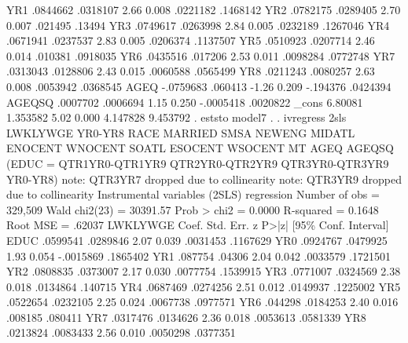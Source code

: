          YR1 {\VBAR}   .0844662   .0318107     2.66   0.008     .0221182    .1468142
         YR2 {\VBAR}   .0782175   .0289405     2.70   0.007      .021495      .13494
         YR3 {\VBAR}   .0749617   .0263998     2.84   0.005     .0232189    .1267046
         YR4 {\VBAR}   .0671941   .0237537     2.83   0.005     .0206374    .1137507
         YR5 {\VBAR}   .0510923   .0207714     2.46   0.014      .010381    .0918035
         YR6 {\VBAR}   .0435516    .017206     2.53   0.011     .0098284    .0772748
         YR7 {\VBAR}   .0313043   .0128806     2.43   0.015     .0060588    .0565499
         YR8 {\VBAR}   .0211243   .0080257     2.63   0.008     .0053942    .0368545
        AGEQ {\VBAR}  -.0759683    .060413    -1.26   0.209     -.194376    .0424394
      AGEQSQ {\VBAR}   .0007702   .0006694     1.15   0.250    -.0005418    .0020822
       _cons {\VBAR}    6.80081   1.353582     5.02   0.000     4.147828    9.453792
{\smallskip}
. eststo model7
{\smallskip}
. 
. ivregress 2sls LWKLYWGE YR0-YR8 RACE MARRIED SMSA NEWENG MIDATL ENOCENT WNOCENT SOATL ESOCENT WSOCENT MT AGEQ AGEQSQ (EDUC = QTR1YR0-QTR1YR9 QTR2YR0-QTR2YR9 QTR3YR0-QTR3YR9 YR0-YR8)
note: QTR3YR7 dropped due to collinearity
note: QTR3YR9 dropped due to collinearity
{\smallskip}
Instrumental variables (2SLS) regression          Number of obs   =    329,509
                                                  Wald chi2(23)   =   30391.57
                                                  Prob > chi2     =     0.0000
                                                  R-squared       =     0.1648
                                                  Root MSE        =     .62037
{\smallskip}
    LWKLYWGE {\VBAR}      Coef.   Std. Err.      z    P>|z|     [95\% Conf. Interval]
        EDUC {\VBAR}   .0599541   .0289846     2.07   0.039     .0031453    .1167629
         YR0 {\VBAR}   .0924767   .0479925     1.93   0.054    -.0015869    .1865402
         YR1 {\VBAR}    .087754     .04306     2.04   0.042     .0033579    .1721501
         YR2 {\VBAR}   .0808835   .0373007     2.17   0.030     .0077754    .1539915
         YR3 {\VBAR}   .0771007   .0324569     2.38   0.018     .0134864     .140715
         YR4 {\VBAR}   .0687469   .0274256     2.51   0.012     .0149937    .1225002
         YR5 {\VBAR}   .0522654   .0232105     2.25   0.024     .0067738    .0977571
         YR6 {\VBAR}    .044298   .0184253     2.40   0.016      .008185     .080411
         YR7 {\VBAR}   .0317476   .0134626     2.36   0.018     .0053613    .0581339
         YR8 {\VBAR}   .0213824   .0083433     2.56   0.010     .0050298    .0377351
